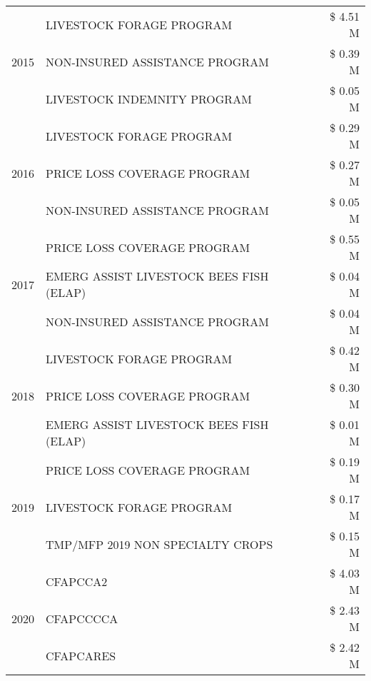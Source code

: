 \begin{tabular}{llr}
\cline{1-3}
\multirow[t]{3}{*}{2015} & LIVESTOCK FORAGE PROGRAM & \$ 4.51 M \\
 & NON-INSURED ASSISTANCE PROGRAM & \$ 0.39 M \\
 & LIVESTOCK INDEMNITY PROGRAM & \$ 0.05 M \\
\cline{1-3}
\multirow[t]{3}{*}{2016} & LIVESTOCK FORAGE PROGRAM & \$ 0.29 M \\
 & PRICE LOSS COVERAGE PROGRAM & \$ 0.27 M \\
 & NON-INSURED ASSISTANCE PROGRAM & \$ 0.05 M \\
\cline{1-3}
\multirow[t]{3}{*}{2017} & PRICE LOSS COVERAGE PROGRAM & \$ 0.55 M \\
 & EMERG ASSIST LIVESTOCK BEES FISH (ELAP) & \$ 0.04 M \\
 & NON-INSURED ASSISTANCE PROGRAM & \$ 0.04 M \\
\cline{1-3}
\multirow[t]{3}{*}{2018} & LIVESTOCK FORAGE PROGRAM & \$ 0.42 M \\
 & PRICE LOSS COVERAGE PROGRAM & \$ 0.30 M \\
 & EMERG ASSIST LIVESTOCK BEES FISH (ELAP) & \$ 0.01 M \\
\cline{1-3}
\multirow[t]{3}{*}{2019} & PRICE LOSS COVERAGE PROGRAM & \$ 0.19 M \\
 & LIVESTOCK FORAGE PROGRAM & \$ 0.17 M \\
 & TMP/MFP 2019 NON SPECIALTY CROPS & \$ 0.15 M \\
\cline{1-3}
\multirow[t]{3}{*}{2020} & CFAPCCA2 & \$ 4.03 M \\
 & CFAPCCCCA & \$ 2.43 M \\
 & CFAPCARES & \$ 2.42 M \\
\cline{1-3}
\bottomrule
\end{tabular}
